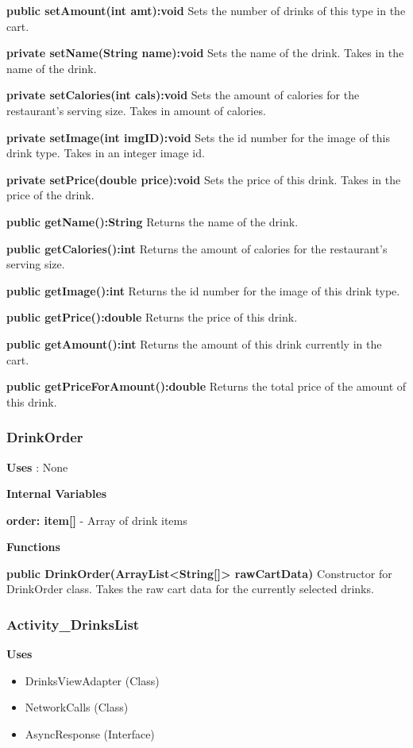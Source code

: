 \documentclass [10pt]{article}
\begin{document}
\textbf{public setAmount(int amt):void}
Sets the number of drinks of this type in the cart.

\textbf{private setName(String name):void}
Sets the name of the drink. Takes in the name of the drink.

\textbf{private setCalories(int cals):void}
Sets the amount of calories for the restaurant's serving size. Takes in amount of calories.

\textbf{private setImage(int imgID):void}
Sets the id number for the image of this drink type. Takes in an integer image id.

\textbf{private setPrice(double price):void}
Sets the price of this drink. Takes in the price of the drink.

\textbf{public getName():String}
Returns the name of the drink.

\textbf{public getCalories():int}
Returns the amount of calories for the restaurant's serving size.

\textbf{public getImage():int}
Returns the id number for the image of this drink type.

\textbf{public getPrice():double}
Returns the price of this drink.

\textbf{public getAmount():int}
Returns the amount of this drink currently in the cart.

\textbf{public getPriceForAmount():double}
Returns the total price of the amount of this drink.

\subsubsection{DrinkOrder}
\textbf{Uses} : None

\textbf{Internal Variables}

\textbf{order: item[]} - Array of drink items

\textbf{Functions}

\textbf{public DrinkOrder(ArrayList<String[]> rawCartData)}
Constructor for DrinkOrder class. Takes the raw cart data for the currently selected drinks.

\subsubsection{Activity\_DrinksList}

\textbf{Uses}

\begin{itemize}
	\item DrinksViewAdapter (Class)
	\item NetworkCalls (Class)
	\item AsyncResponse (Interface)
\end{itemize}
\end{document}
